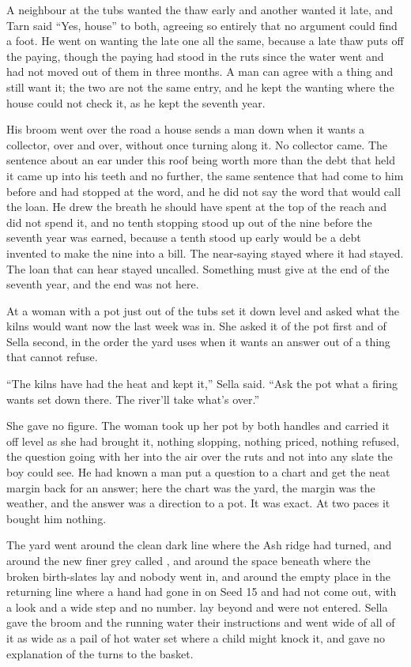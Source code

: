 A neighbour at the tubs wanted the thaw early and another wanted it late, and Tarn said “Yes, house” to both, agreeing so entirely that no argument could find a foot. He went on wanting the late one all the same, because a late thaw puts off the paying, though the paying had stood in the ruts since the water went and had not moved out of them in three months. A man can agree with a thing and still want it; the two are not the same entry, and he kept the wanting where the house could not check it, as he kept the seventh year.

His broom went over the road a house sends a man down when it wants a collector, over and over, without once turning along it. No collector came. The sentence about an ear under this roof being worth more than the debt that held it came up into his teeth and no further, the same sentence that had come to him before and had stopped at the word, and he did not say the word that would call the loan. He drew the breath he should have spent at the top of the reach and did not spend it, and no tenth stopping stood up out of the nine before the seventh year was earned, because a tenth stood up early would be a debt invented to make the nine into a bill. The near-saying stayed where it had stayed. The loan that can hear stayed uncalled. Something must give at the end of the seventh year, and the end was not here.

At  a woman with a pot just out of the tubs set it down level and asked what the kilns would want now the last week was in. She asked it of the pot first and of Sella second, in the order the yard uses when it wants an answer out of a thing that cannot refuse.

“The kilns have had the heat and kept it,” Sella said. “Ask the pot what a firing wants set down there. The river'll take what's over.”

She gave no figure. The woman took up her pot by both handles and carried it off level as she had brought it, nothing slopping, nothing priced, nothing refused, the question going with her into the air over the ruts and not into any slate the boy could see. He had known a man put a question to a chart and get the neat margin back for an answer; here the chart was the yard, the margin was the weather, and the answer was a direction to a pot. It was exact. At two paces it bought him nothing.

The yard went around the clean dark line where the Ash ridge had turned, and around the new finer grey called , and around the space beneath  where the broken birth-slates lay and nobody went in, and around the empty place in the returning line where a hand had gone in on Seed 15 and had not come out, with a look and a wide step and no number.  lay beyond and were not entered. Sella gave the broom and the running water their instructions and went wide of all of it as wide as a pail of hot water set where a child might knock it, and gave no explanation of the turns to the basket.


